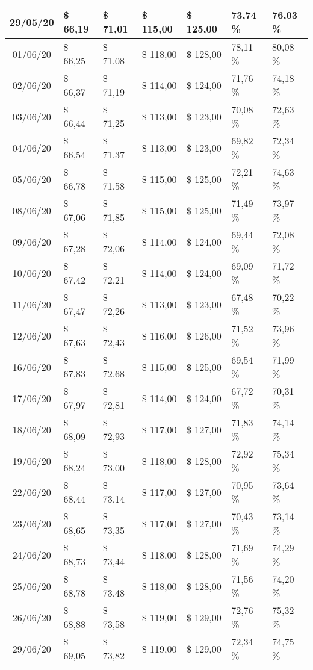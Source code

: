 \begin{center}
\begin{longtable}{|c|p{1.5cm}|p{1.5cm}|p{1.5cm}|p{1.5cm}|p{1.5cm}|p{1.5cm}|}
29/05/20 & \$ 66,19 & \$ 71,01 & \$ 115,00 & \$ 125,00 & 73,74 \% & 76,03 \% \\ \hline
01/06/20 & \$ 66,25 & \$ 71,08 & \$ 118,00 & \$ 128,00 & 78,11 \% & 80,08 \% \\ \hline
02/06/20 & \$ 66,37 & \$ 71,19 & \$ 114,00 & \$ 124,00 & 71,76 \% & 74,18 \% \\ \hline
03/06/20 & \$ 66,44 & \$ 71,25 & \$ 113,00 & \$ 123,00 & 70,08 \% & 72,63 \% \\ \hline
04/06/20 & \$ 66,54 & \$ 71,37 & \$ 113,00 & \$ 123,00 & 69,82 \% & 72,34 \% \\ \hline
05/06/20 & \$ 66,78 & \$ 71,58 & \$ 115,00 & \$ 125,00 & 72,21 \% & 74,63 \% \\ \hline
08/06/20 & \$ 67,06 & \$ 71,85 & \$ 115,00 & \$ 125,00 & 71,49 \% & 73,97 \% \\ \hline
09/06/20 & \$ 67,28 & \$ 72,06 & \$ 114,00 & \$ 124,00 & 69,44 \% & 72,08 \% \\ \hline
10/06/20 & \$ 67,42 & \$ 72,21 & \$ 114,00 & \$ 124,00 & 69,09 \% & 71,72 \% \\ \hline
11/06/20 & \$ 67,47 & \$ 72,26 & \$ 113,00 & \$ 123,00 & 67,48 \% & 70,22 \% \\ \hline
12/06/20 & \$ 67,63 & \$ 72,43 & \$ 116,00 & \$ 126,00 & 71,52 \% & 73,96 \% \\ \hline
16/06/20 & \$ 67,83 & \$ 72,68 & \$ 115,00 & \$ 125,00 & 69,54 \% & 71,99 \% \\ \hline
17/06/20 & \$ 67,97 & \$ 72,81 & \$ 114,00 & \$ 124,00 & 67,72 \% & 70,31 \% \\ \hline
18/06/20 & \$ 68,09 & \$ 72,93 & \$ 117,00 & \$ 127,00 & 71,83 \% & 74,14 \% \\ \hline
19/06/20 & \$ 68,24 & \$ 73,00 & \$ 118,00 & \$ 128,00 & 72,92 \% & 75,34 \% \\ \hline
22/06/20 & \$ 68,44 & \$ 73,14 & \$ 117,00 & \$ 127,00 & 70,95 \% & 73,64 \% \\ \hline
23/06/20 & \$ 68,65 & \$ 73,35 & \$ 117,00 & \$ 127,00 & 70,43 \% & 73,14 \% \\ \hline
24/06/20 & \$ 68,73 & \$ 73,44 & \$ 118,00 & \$ 128,00 & 71,69 \% & 74,29 \% \\ \hline
25/06/20 & \$ 68,78 & \$ 73,48 & \$ 118,00 & \$ 128,00 & 71,56 \% & 74,20 \% \\ \hline
26/06/20 & \$ 68,88 & \$ 73,58 & \$ 119,00 & \$ 129,00 & 72,76 \% & 75,32 \% \\ \hline
29/06/20 & \$ 69,05 & \$ 73,82 & \$ 119,00 & \$ 129,00 & 72,34 \% & 74,75 \% \\ \hline

\end{longtable}
\end{center}
